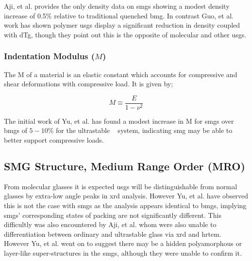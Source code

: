 \documentclass[a4paper,12pt,oneside]{report}%
\begin{document}
Aji, et al. \cite{Aji2013} provides the only density data on \glspl{smg} showing a modest density increase of 0.5\% relative to traditional quenched \gls{bmg}. In contrast Guo, et al. \cite{Guo2012} work has shown polymer \glspl{usg} display a significant reduction in density coupled with \gls{dTg}, though they point out this is the opposite of molecular and other \glspl{usg}. 

\subsubsection{Indentation Modulus ($M$)}
The \gls{M} of a material is an elastic constant which accounts for compressive and shear deformations with compressive load. It is given by;

\begin{equation}
M \equiv 
\frac{E}
{1-\nu^{2}}
\label{equ:IndentModulus}
\end{equation}

The initial work of Yu, et al. \cite{Yu2013} has found a modest increase in \gls{M} for \glspl{smg} over \glspl{bmg} of $5- 10\%$ for the ultrastable \ZrCuAl~ system, indicating \gls{smg} may be able to better support compressive loads. 

\subsection{SMG Structure, Medium Range Order (MRO)} 
From molecular glasses it is expected \glspl{usg} will be distinguishable from normal glasses by extra-low angle peaks in \gls{xrd} analysis. However Yu, et al. \cite{Yu2013} have observed this is not the case with \glspl{smg} as the analysis appears identical to \glspl{bmg}, implying \glspl{smg}' corresponding states of packing are not significantly different. This difficultly was also encountered by Aji, et al. \cite{Aji2013} whom were also unable to differentiation between ordinary and ultrastable glass via \gls{xrd} and \gls{hrtem}. However Yu, et al. \cite{Yu2013} went on to suggest there may be a hidden polyamorphous or layer-like super-structures in the \glspl{smg}, although they were unable to confirm it. 
\end{document}
